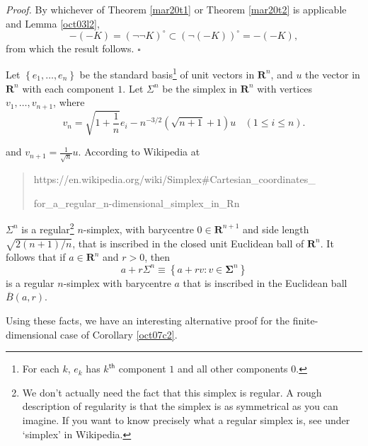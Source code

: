 \documentclass[11pt]{article}%
\newenvironment{proof}[1][Proof]{\noindent\textit{#1.} }{}
\begin{document}
\begin{proof}
By whichever of Theorem \ref{mar20t1} or Theorem \ref{mar20t2} is applicable
and Lemma \ref{oct03l2},%
\[
-(-K)=(\lnot\lnot K)^{\circ}\subset\left(  \lnot(-K)\right)  ^{\circ}=-(-K),
\]
from which the result follows.%
\hfill
$\square$
\end{proof}

%

\medskip
Let $\left\{  e_{1},\ldots,e_{n}\right\}  $ be the standard basis\footnote{%
\normalfont\sf
For each $k$, $e_{k}$ has $k^{\mathsf{th}}$ component $1$ and all other
components $0$.} of unit vectors in $\mathbf{R}^{n}$, and $u$ the vector in
$\mathbf{R}^{n}$ with each component $1$. Let $\Sigma^{n}$ be the simplex in
$\mathbf{R}^{n}$ with vertices $v_{1},\ldots,v_{n+1}$, where%
\[
v_{n}=\sqrt{1+\frac{1}{n}}e_{i}-n^{-3/2}\left(  \sqrt{n+1}+1\right)
u\ \ \ \ (1\leq i\leq n).
\]


and $v_{n+1}=\frac{1}{\sqrt{n}}u$. According to Wikipedia at

\begin{quote}
{\small https://en.wikipedia.org/wiki/Simplex\#Cartesian\_coordinates\_}

{\small for\_a\_regular\_n-dimensional\_simplex\_in\_Rn}
\end{quote}

%

\noindent
$\Sigma^{n}$ is a regular\footnote{%
\normalfont\sf
We don't actually need the fact that this simplex is regular. A rough
description of regularity is that the simplex is as symmetrical as you can
imagine. If you want to know precisely what a regular simplex is, see under
`simplex' in Wikipedia.} $n$-simplex, with barycentre $0\in\mathbf{R}^{n+1}$
and side length $\sqrt{2(n+1)/n}$, that is inscribed in the closed unit
Euclidean ball of $\mathbf{R}^{n}$. It follows that if $a\in\mathbf{R}^{n}$
and $r>0$, then%
\[
a+r\Sigma^{n}\equiv\left\{  a+rv:v\in\mathbf{\Sigma}^{n}\right\}
\]
is a regular $n$-simplex with barycentre $a$ that is inscribed in the
Euclidean ball $\overline{B}(a,r)$.

Using these facts, we have an interesting alternative proof for the
finite-dimensional case of Corollary \ref{oct07c2}.
\end{document}
